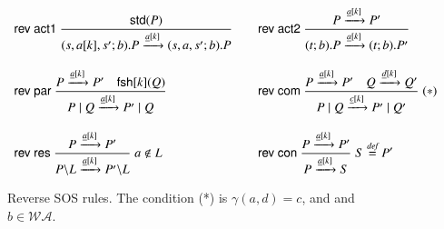 \documentclass[review]{elsarticle}
\newcommand{\paral}{\; \vert \;}
\newcommand{\Rule}[2]{\displaystyle{\frac{#1}{#2}}}
\newcommand{\mA}{\mathcal{A}}
\newcommand{\mAK}{\mathcal{AK}}
\newcommand{\rom}[1]{\mbox{\rm{#1}}}
\newcommand{\std}[1]{\mathsf{std}(#1)}
\newcommand{\fresh}[2]{\mathsf{fsh}[#1](#2)}
\newcommand{\bydef}{\stackrel{\emph{def}}{=}}
\newcommand{\rulename}[1]{\textsf{#1}}
\begin{document}
\begin{figure}[t]
\[
\begin{array}{ll}
\rulename{rev act1}\
\Rule
{\std{P} %
}
{(s,a[k],s';b).P \xrightarrow{\underline{a}[k]}(s,a,s';b).P}
\quad &
%
%
%
\rulename{rev act2}\
\Rule
{P \xrightarrow{\underline{a}[k]} P' %
}
{(t;b).P \xrightarrow{\underline{a}[k]} (t;b).P'}
\\[25pt]
\rulename{rev par}\
\Rule
{P \xrightarrow{\underline{a}[k]} P'\quad \fresh{k}{Q}}
{P \paral Q \xrightarrow{\underline{a}[k]} P' \paral Q}
\quad &
\rulename{rev com}\
\Rule
{P \xrightarrow{\underline{a}[k]} P' \quad Q \xrightarrow{\underline{d}[k]} Q'}
{P \paral Q \xrightarrow{\underline{c}[k]} P' \paral Q'}
\; (*)
%
\\[25pt]
\rulename{rev res}\
\Rule
{P \xrightarrow{\underline{a}[k]} P'}
{P\backslash L \xrightarrow{\underline{a}[k]} P'\backslash L}
\; a \notin L
\quad &
\rulename{rev con}\
\Rule
{P \xrightarrow{\underline{a}[k]} P'}
{P \xrightarrow{\underline{a}[k]} S}
\; S \bydef P'
\end{array}
\]
\caption{Reverse SOS rules. The condition (*) is $\gamma(a,d)=c$, and 
and $b \in \mathcal{WA}$. %
} 
\label{fig:reversesos}
\end{figure}
\end{document}
